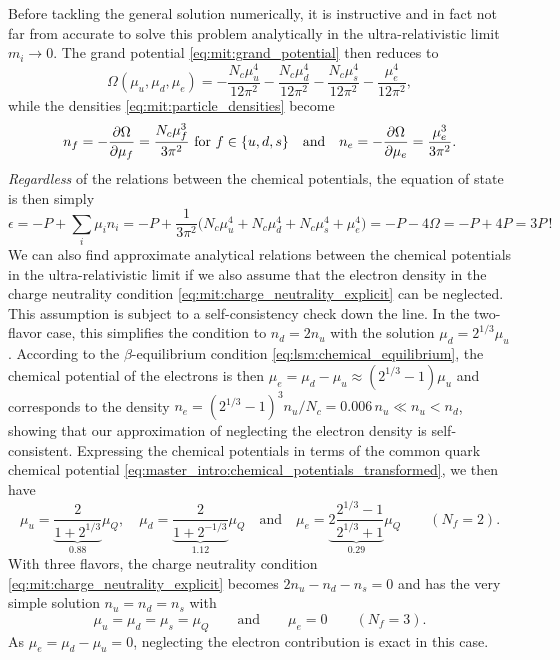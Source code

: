 Before tackling the general solution numerically,
it is instructive and in fact not far from accurate to solve this problem analytically in the ultra-relativistic limit $m_i \rightarrow 0$.
The grand potential \eqref{eq:mit:grand_potential} then reduces to
\begin{equation}
	\Omega(\mu_u, \mu_d, \mu_e) = -\frac{N_c \mu_u^4}{12 \pi^2} - \frac{N_c \mu_d^4}{12 \pi^2} - \frac{N_c \mu_s^4}{12 \pi^2} - \frac{\mu_e^4}{12 \pi^2},
\label{eq:mit:grand_potential_massless}
\end{equation}
while the densities \eqref{eq:mit:particle_densities} become
\begin{equation}
	n_f = -\pdv{\Omega}{\mu_f} = \frac{N_c \mu_f^3}{3 \pi^2}
	\text{ for $f \in \{u,d,s\}$}
	\quad \text{and} \quad
	n_e = -\pdv{\Omega}{\mu_e} = \frac{    \mu_e^3}{3 \pi^2}.
\label{eq:mit:densities_massless}
\end{equation}
\emph{Regardless} of the relations between the chemical potentials,
the equation of state is then simply
\begin{equation}
	\epsilon = -P + \sum_i \mu_i n_i
	         = -P + \frac{1}{3 \pi^2} \Big(N_c \mu_u^4 + N_c \mu_d^4 + N_c \mu_s^4 + \mu_e^4\Big)
	         = -P - 4 \Omega 
	         = -P + 4 P 
	         = 3 P \, !
\label{eq:mit:eos_ur}
\end{equation}
We can also find approximate analytical relations between the chemical potentials in the ultra-relativistic limit
if we also assume that the electron density in the charge neutrality condition \eqref{eq:mit:charge_neutrality_explicit} can be neglected.
This assumption is subject to a self-consistency check down the line.
In the two-flavor case, this simplifies the condition to $n_d = 2 n_u$ with the solution $\mu_d = 2^{1/3} \mu_u$.
According to the $\beta$-equilibrium condition \eqref{eq:lsm:chemical_equilibrium},
the chemical potential of the electrons is then $\mu_e = \mu_d - \mu_u \approx (2^{1/3}-1) \mu_u$
and corresponds to the density $n_e = (2^{1/3}-1)^3 n_u / N_c = 0.006 \, n_u \ll n_u < n_d$,
showing that our approximation of neglecting the electron density is self-consistent.
Expressing the chemical potentials in terms of the common quark chemical potential \eqref{eq:master_intro:chemical_potentials_transformed},
we then have
\begin{equation}
	\mu_u = \underbrace{\frac{2}{1+2^{1/3}}}_{0.88} \mu_Q , \quad
	\mu_d = \underbrace{\frac{2}{1+2^{-1/3}}}_{1.12} \mu_Q \quad \text{and} \quad
	\mu_e = \underbrace{2 \frac{2^{1/3}-1}{2^{1/3}+1}}_{0.29} \mu_Q
	\qquad (N_f = 2) .
\label{eq:mit:chemical_potentials_massless_2f}
\end{equation}
With three flavors, the charge neutrality condition \eqref{eq:mit:charge_neutrality_explicit} becomes $2 n_u - n_d - n_s = 0$
and has the very simple solution $n_u = n_d = n_s$ with
\begin{equation}
	\mu_u = \mu_d = \mu_s = \mu_Q
	\qquad \text{and} \qquad
	\mu_e = 0
	\qquad (N_f = 3) .
\label{eq:mit:chemical_potentials_massless_3f}
\end{equation}
As $\mu_e = \mu_d - \mu_u = 0$, neglecting the electron contribution is exact in this case.

